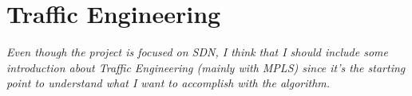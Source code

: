 \section{Traffic Engineering}
\label{sec:TE}

\emph{ {\color{red}Even though the project is focused on SDN, I think that I should include some introduction about Traffic Engineering (mainly with MPLS) since it's the starting point to understand what I want to accomplish with the algorithm.}}